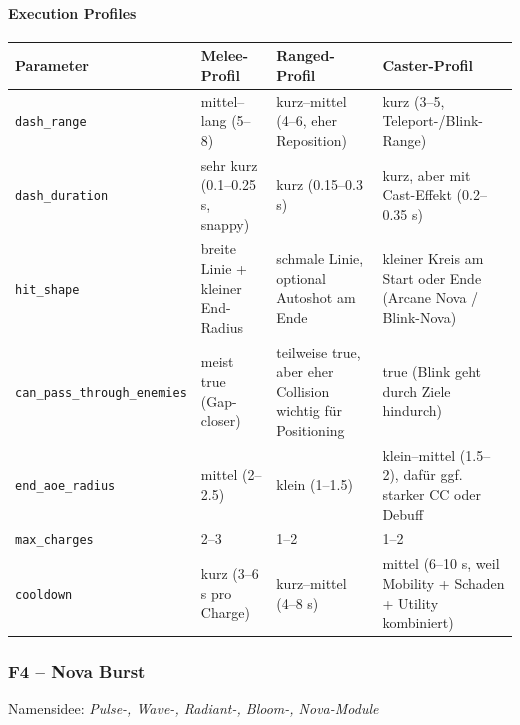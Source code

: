 \paragraph{Execution Profiles}{}
\scriptsize %
\begin{tabular}{p{3cm} | p{4cm} | p{4cm} | p{4cm}}
	Parameter         & Melee-Profil                                                 & Ranged-Profil                                                  & Caster-Profil                                                \\
	\hline
	\texttt{dash\_range}      & mittel–lang (5–8)                                           & kurz–mittel (4–6, eher Reposition)                            & kurz (3–5, Teleport-/Blink-Range)                            \\
	\texttt{dash\_duration}   & sehr kurz (0.1–0.25 s, snappy)                              & kurz (0.15–0.3 s)                                             & kurz, aber mit Cast-Effekt (0.2–0.35 s)                      \\
	\texttt{hit\_shape}       & breite Linie + kleiner End-Radius                           & schmale Linie, optional Autoshot am Ende                      & kleiner Kreis am Start oder Ende (Arcane Nova / Blink-Nova)  \\
	\texttt{can\_pass\_through\_enemies} & meist true (Gap-closer)                           & teilweise true, aber eher Collision wichtig für Positioning   & true (Blink geht durch Ziele hindurch)                       \\
	\texttt{end\_aoe\_radius}  & mittel (2–2.5)                                              & klein (1–1.5)                                                 & klein–mittel (1.5–2), dafür ggf. starker CC oder Debuff      \\
	\texttt{max\_charges}     & 2–3                                                          & 1–2                                                           & 1–2                                                          \\
	\texttt{cooldown}        & kurz (3–6 s pro Charge)                                     & kurz–mittel (4–8 s)                                           & mittel (6–10 s, weil Mobility + Schaden + Utility kombiniert)\\
	\hline
\end{tabular}
\normalsize
\subsubsection{F4 – Nova Burst}
Namensidee: \emph{Pulse-, Wave-, Radiant-, Bloom-, Nova-Module}

